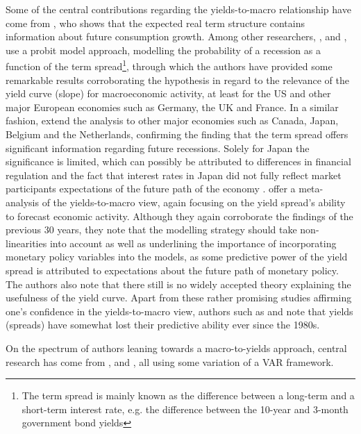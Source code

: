 Some of the central contributions regarding the yields-to-macro relationship have come from \citet{harvey1988real}, who shows that the expected real term structure contains information about future consumption growth.
Among other researchers, \citet{estrella1991term}, \citet{estrella1995term} and \citet{estrella1996yield}, use a probit model approach, modelling the probability of a recession as a function of the term spread\footnote{The term spread is mainly known as the difference between a long-term and a short-term interest rate, e.g. the difference between the 10-year and 3-month government bond yields}, through which the authors have provided some remarkable results corroborating the hypothesis in regard to the relevance of the yield curve (slope) for macroeconomic activity, at least for the US and other major European economies such as Germany, the UK and France.
In a similar fashion, \citet{bernard1996} extend the analysis to other major economies such as Canada, Japan, Belgium and the Netherlands, confirming the finding that the term spread offers significant information regarding future recessions. 
Solely for Japan the significance is limited, which can possibly be attributed to differences in financial regulation and the fact that interest rates in Japan did not fully reflect market participants expectations of the future path of the economy \citep{bernard1996}. 
\citet{evgenidis2018yield} offer a meta-analysis of the yields-to-macro view, again focusing on the yield spread's ability to forecast economic activity. Although they again corroborate the findings of the previous 30 years, they note that the modelling strategy should take non-linearities into account as well as underlining the importance of incorporating monetary policy variables into the models, as some predictive power of the yield spread is attributed to expectations about the future path of monetary policy. The authors also note that there still is no widely accepted theory explaining the usefulness of the yield curve. 
Apart from these rather promising studies affirming one's confidence in the yields-to-macro view, authors such as \citet{dotsey1998predictive} and \citet{stock_watson_2001} note that yields (spreads) have somewhat lost their predictive ability ever since the 1980s. 

On the spectrum of authors leaning towards a macro-to-yields approach, central research has come from \citet{evans1998monetary}, \citet{ang2003no} and \citet{evans2007economic}, all using some variation of a VAR framework. 

